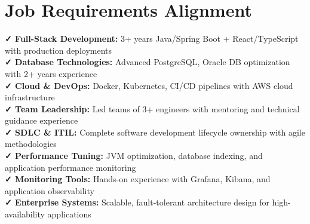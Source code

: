 \documentclass[a4paper,10pt]{article}
\begin{document}
\section*{Job Requirements Alignment}
\vspace{-4pt}
\textbf{✓ Full-Stack Development:} 3+ years Java/Spring Boot + React/TypeScript with production deployments \\
\textbf{✓ Database Technologies:} Advanced PostgreSQL, Oracle DB optimization with 2+ years experience \\
\textbf{✓ Cloud \& DevOps:} Docker, Kubernetes, CI/CD pipelines with AWS cloud infrastructure \\
\textbf{✓ Team Leadership:} Led teams of 3+ engineers with mentoring and technical guidance experience \\
\textbf{✓ SDLC \& ITIL:} Complete software development lifecycle ownership with agile methodologies \\
\textbf{✓ Performance Tuning:} JVM optimization, database indexing, and application performance monitoring \\
\textbf{✓ Monitoring Tools:} Hands-on experience with Grafana, Kibana, and application observability \\
\textbf{✓ Enterprise Systems:} Scalable, fault-tolerant architecture design for high-availability applications
\end{document}
